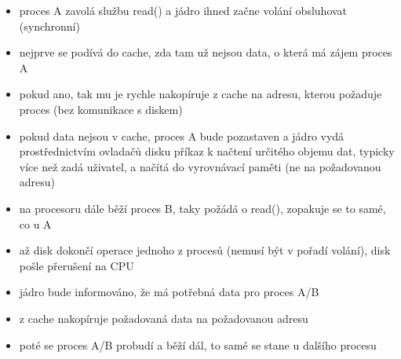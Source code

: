 \documentclass[a4paper, 11pt]{article}
\begin{document}
\begin{itemize}
    \item proces A zavolá službu read() a jádro ihned začne volání obsluhovat (synchronní)
    \item nejprve se podívá do cache, zda tam už nejsou data, o která má zájem proces A
    \item pokud ano, tak mu je rychle nakopíruje z cache na adresu, kterou požaduje proces (bez komunikace s diskem)
    \item pokud data nejsou v cache, proces A bude pozastaven a jádro vydá prostřednictvím ovladačů disku příkaz k načtení určitého objemu dat, typicky více než zadá uživatel, a načítá do vyrovnávací paměti (ne na požadovanou adresu)
    \item na procesoru dále běží proces B, taky požádá o read(), zopakuje se to samé, co u A
    \item až disk dokončí operace jednoho z procesů (nemusí být v pořadí volání), disk pošle přerušení na CPU
    \item jádro bude informováno, že má potřebná data pro proces A/B
    \item z cache nakopíruje požadovaná data na požadovanou adresu
    \item poté se proces A/B probudí a běží dál, to samé se stane u dalšího procesu
\end{itemize}
\end{document}
